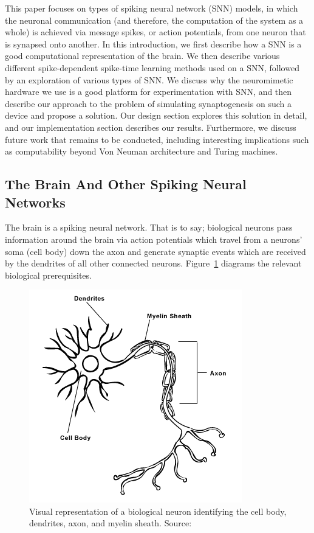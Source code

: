 \documentclass[journal]{./sty/IEEEtran}
\begin{document}
This paper focuses on types of spiking neural network (SNN) models, in which the neuronal communication (and therefore, the computation of the system as a whole) is achieved via message spikes, or action potentials, from one neuron that is synapsed onto another. 
In this introduction, we first describe how a SNN is a good computational representation of the brain. 
We then describe various different spike-dependent spike-time learning methods used on a SNN, followed by an exploration of various types of SNN. 
We discuss why the neuromimetic hardware we use is a good platform for experimentation with SNN, and then describe our approach to the problem of simulating synaptogenesis on such a device and propose a solution. 
Our design section explores this solution in detail, and our implementation section describes our results.
Furthermore, we discuss future work that remains to be conducted, including interesting implications such as computability beyond Von Neuman architecture and Turing machines.

\subsection{The Brain And Other Spiking Neural Networks}
The brain is a spiking neural network. 
That is to say; biological neurons pass information around the brain via action potentials which travel from a neurons' soma (cell body) down the axon and generate synaptic events which are received by the dendrites of all other connected neurons.
Figure~\ref{fig:neuron} diagrams the relevant biological prerequisites.

\begin{figure}
\centering
\includegraphics[scale=0.6]{imgs/neuron.png}
\caption{Visual representation of a biological neuron identifying the cell body, dendrites, axon, and myelin sheath. 
Source: \cite{img:N} \label{fig:neuron}}
\end{figure}
\end{document}
